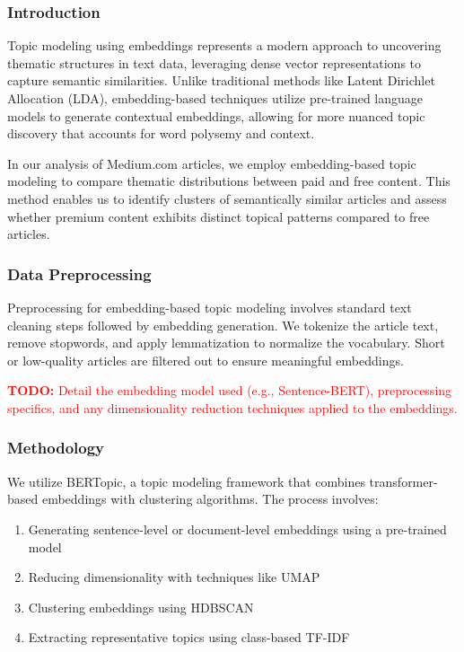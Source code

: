 \documentclass[11pt,a4paper]{article}
\newcommand{\todo}[1]{\textcolor{red}{\textbf{TODO:} #1}}
\begin{document}
\subsubsection{Introduction}

Topic modeling using embeddings represents a modern approach to uncovering thematic structures in text data, leveraging dense vector representations to capture semantic similarities. Unlike traditional methods like Latent Dirichlet Allocation (LDA), embedding-based techniques utilize pre-trained language models to generate contextual embeddings, allowing for more nuanced topic discovery that accounts for word polysemy and context.

In our analysis of Medium.com articles, we employ embedding-based topic modeling to compare thematic distributions between paid and free content. This method enables us to identify clusters of semantically similar articles and assess whether premium content exhibits distinct topical patterns compared to free articles.

\subsubsection{Data Preprocessing}

Preprocessing for embedding-based topic modeling involves standard text cleaning steps followed by embedding generation. We tokenize the article text, remove stopwords, and apply lemmatization to normalize the vocabulary. Short or low-quality articles are filtered out to ensure meaningful embeddings.

\todo{Detail the embedding model used (e.g., Sentence-BERT), preprocessing specifics, and any dimensionality reduction techniques applied to the embeddings.}

\subsubsection{Methodology}

We utilize BERTopic, a topic modeling framework that combines transformer-based embeddings with clustering algorithms. The process involves:
\begin{enumerate}
    \item Generating sentence-level or document-level embeddings using a pre-trained model
    \item Reducing dimensionality with techniques like UMAP
    \item Clustering embeddings using HDBSCAN
    \item Extracting representative topics using class-based TF-IDF
\end{enumerate}
\end{document}
